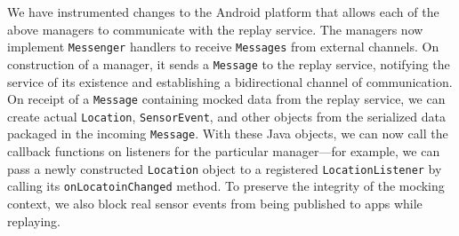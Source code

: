 \newpage
We have instrumented changes to the Android platform that allows each of the
above managers to communicate with the \PocketMocker{} replay service. The
managers now implement \texttt{Messenger} handlers to receive
\texttt{Messages} from external channels. On construction of a manager, it
sends a \texttt{Message} to the replay service, notifying the service of its
existence and establishing a bidirectional channel of communication. On
receipt of a \texttt{Message} containing mocked data from the replay service,
we can create actual \texttt{Location}, \texttt{SensorEvent}, and other
objects from the serialized data packaged in the incoming \texttt{Message}.
With these Java objects, we can now call the callback functions on listeners
for the particular manager---for example, we can pass a newly constructed
\texttt{Location} object to a registered \texttt{LocationListener} by calling
its \texttt{onLocatoinChanged} method. To preserve the integrity of the
mocking context, we also block real sensor events from being published to
apps while replaying.

